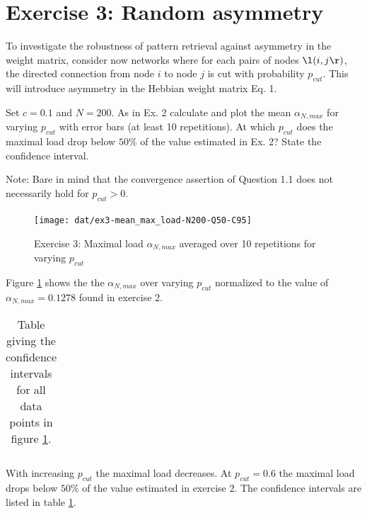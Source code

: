 \section{Exercise 3: Random asymmetry}

\begin{itshape}
\small
To investigate the robustness of pattern retrieval against asymmetry in the weight matrix, consider now networks where for each pairs of nodes $\l(i, j\r)$, the directed connection from node $i$ to node $j$ is cut with probability $p_{cut}$. This will introduce asymmetry in the Hebbian weight matrix Eq. 1.

Set $c=0.1$ and $N = 200$. As in Ex. 2 calculate and plot the mean $\alpha_{N,max}$ for varying $p_{cut}$ with error bars (at least 10 repetitions). At which $p_{cut}$ does the maximal load drop below $50\%$ of the value estimated in Ex. 2? State the confidence interval.

Note: Bare in mind that the convergence assertion of Question 1.1 does not necessarily hold for $p_{cut} > 0$.
\end{itshape}

\paragraph*{}



\begin{figure}[H]
  \vspace{-20pt}
  \begin{center}
    \texttt{[image: dat/ex3-mean\_max\_load-N200-Q50-C95]}
  \end{center}
  \vspace{-20pt}
  \caption{Exercise 3: Maximal load $\alpha_{N,max}$ averaged over 10 repetitions for varying $p_{cut}$ }
  \label{fig:exercise3}
  \vspace{-10pt}
\end{figure}

Figure \ref{fig:exercise3} shows the the $\alpha_{N,max}$ over varying $p_{cut}$ normalized to the value of $\alpha_{N,max}=0.1278$ found in exercise 2.

\begin{table}[H] 
\centering 
\begin{tabular}{|l|l|l|l|l|l|l|l|} 
\hline 
	
\hline
\end{tabular}
\label{tbl:exercise3_CI}
\caption{Table giving the confidence intervals for all data points in figure \ref{fig:exercise3}.}
\end{table} 

With increasing $p_{cut}$ the maximal load decreases. At $p_{cut} = 0.6$ the maximal load drops below $50\%$ of the value estimated in exercise 2. The confidence intervals are listed in table \ref{tbl:exercise3_CI}.
